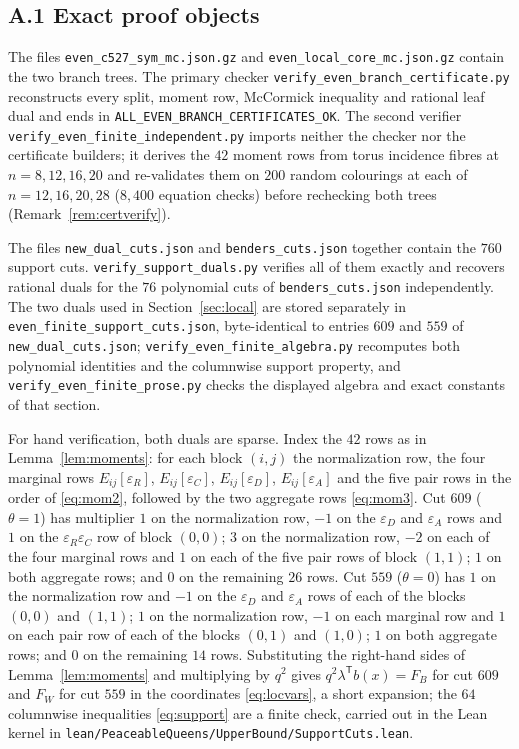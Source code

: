 \documentclass[11pt]{amsart}
\theoremstyle{definition}
\theoremstyle{remark}
\newcommand{\bs}{\discretionary{}{}{}}
\begin{document}
\subsection*{A.1 Exact proof objects}

The files \texttt{even\_\bs{}c527\_\bs{}sym\_\bs{}mc.json.gz} and
\texttt{even\_\bs{}local\_\bs{}core\_\bs{}mc.json.gz} contain the two branch
trees.  The primary checker
\texttt{verify\_\bs{}even\_\bs{}branch\_\bs{}certificate.py} reconstructs
every split, moment row, McCormick inequality and rational leaf dual and
ends in \texttt{ALL\_\bs{}EVEN\_\bs{}BRANCH\_\bs{}CERTIFICATES\_\bs{}OK}.
The second verifier
\texttt{verify\_\bs{}even\_\bs{}finite\_\bs{}independent.py} imports
neither the checker nor the certificate builders; it derives the $42$
moment rows from torus incidence fibres at $n=8,12,16,20$ and re-validates
them on $200$ random colourings at each of $n=12,16,20,28$ ($8{,}400$
equation checks) before rechecking both trees
(Remark~\ref{rem:certverify}).

The files \texttt{new\_\bs{}dual\_\bs{}cuts.json} and
\texttt{benders\_\bs{}cuts.json} together contain the $760$ support cuts.
\texttt{verify\_\bs{}support\_\bs{}duals.py} verifies all of them exactly and
recovers rational duals for the $76$ polynomial cuts of
\texttt{benders\_\bs{}cuts.json} independently.  The two duals used in
Section~\ref{sec:local} are stored separately in
\texttt{even\_\bs{}finite\_\bs{}support\_\bs{}cuts.json}, byte-identical to
entries $609$ and $559$ of \texttt{new\_\bs{}dual\_\bs{}cuts.json};
\texttt{verify\_\bs{}even\_\bs{}finite\_\bs{}algebra.py} recomputes both
polynomial identities and the columnwise support property, and
\texttt{verify\_\bs{}even\_\bs{}finite\_\bs{}prose.py} checks the displayed
algebra and exact constants of that section.

For hand verification, both duals are sparse.  Index the $42$ rows as in
Lemma~\ref{lem:moments}: for each block $(i,j)$ the normalization row, the
four marginal rows $E_{ij}[\varepsilon_R]$, $E_{ij}[\varepsilon_C]$,
$E_{ij}[\varepsilon_D]$, $E_{ij}[\varepsilon_A]$ and the five pair rows in
the order of \eqref{eq:mom2}, followed by the two aggregate rows
\eqref{eq:mom3}.  Cut $609$ ($\theta=1$) has multiplier $1$ on the
normalization row, $-1$ on the $\varepsilon_D$ and $\varepsilon_A$ rows and
$1$ on the $\varepsilon_R\varepsilon_C$ row of block $(0,0)$; $3$ on the
normalization row, $-2$ on each of the four marginal rows and $1$ on each of
the five pair rows of block $(1,1)$; $1$ on both aggregate rows; and $0$ on
the remaining $26$ rows.  Cut $559$ ($\theta=0$) has $1$ on the
normalization row and $-1$ on the $\varepsilon_D$ and $\varepsilon_A$ rows of
each of the blocks $(0,0)$ and $(1,1)$; $1$ on the normalization row, $-1$ on
each marginal row and $1$ on each pair row of each of the blocks $(0,1)$ and
$(1,0)$; $1$ on both aggregate rows; and $0$ on the remaining $14$ rows.
Substituting the right-hand sides of Lemma~\ref{lem:moments} and multiplying
by $q^2$ gives $q^2\lambda^{\mathsf T}b(x)=F_B$ for cut $609$ and $F_W$ for
cut $559$ in the coordinates \eqref{eq:locvars}, a short expansion; the $64$
columnwise inequalities \eqref{eq:support} are a finite check, carried out in
the Lean kernel in
\texttt{lean/PeaceableQueens/UpperBound/SupportCuts.lean}.
\end{document}

